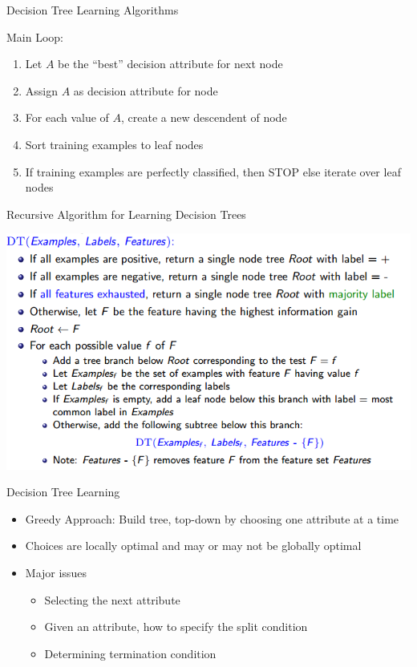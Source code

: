 \documentclass{beamer}
\begin{document}
\begin{frame}{Decision Tree Learning Algorithms}
    
    Main Loop:
    \begin{enumerate}
        \item Let $A$ be the ``best'' decision attribute for next node
        \item Assign $A$ as decision attribute for node
        \item For each value of $A$, create a new descendent of node
        \item Sort training examples to leaf nodes
        \item If training examples are perfectly classified, then STOP else iterate over leaf nodes
    \end{enumerate}
\end{frame}

\begin{frame}{Recursive Algorithm for Learning Decision Trees}
    \begin{center}
        \includegraphics[scale=0.4]{dTreeLearningAlgo.png}
    \end{center}
\end{frame}


\begin{frame}{Decision Tree Learning}
    \begin{itemize}
        \item Greedy Approach: Build tree, top-down by choosing one attribute at a time
        \item Choices are locally optimal and may or may not be globally optimal 
        \item Major issues
        \begin{itemize}
            \item Selecting the next attribute
            \item Given an attribute, how to specify the split condition
            \item Determining termination condition
        \end{itemize}
    \end{itemize}
\end{frame}
\end{document}
